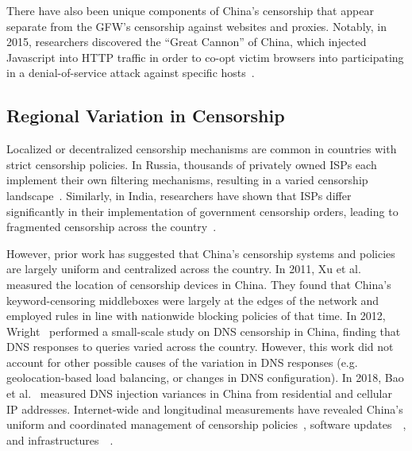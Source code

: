 \documentclass[conference,compsoc]{IEEEtran}
\begin{document}
There have also been unique components of China's censorship that appear
separate from the GFW's censorship against websites and proxies.
Notably,
in 2015, researchers discovered the ``Great Cannon'' of China,
which injected Javascript into HTTP traffic in order to
co-opt victim browsers into participating in a denial-of-service attack against
specific hosts~\cite{Marczak2015a}.

\subsection{Regional Variation in Censorship}

Localized or decentralized censorship mechanisms are common in countries with
strict censorship policies. In Russia, thousands of privately owned ISPs each
implement their own filtering mechanisms, resulting in a varied censorship
landscape~\cite{Xue2022b,Ortwein2023a,Ramesh2020a}.
Similarly, in India, researchers have shown that ISPs differ significantly in their implementation of government censorship orders,
leading to fragmented censorship across the country~\cite{Yadav2018a}.

However,
prior work has suggested that
China's censorship systems and policies are largely uniform and centralized across the country.
%
In 2011, Xu et al.~\cite{Xu2011a} measured the location of censorship devices in China.
They found that China's keyword-censoring middleboxes were largely at the edges of the network
and employed rules in line with nationwide blocking policies of that time.
In 2012, Wright~\cite{Wright2012a} performed a small-scale study on DNS
censorship in China, finding that DNS responses to queries varied across the country.
However, this work did not account for other possible causes of the variation in DNS responses
(e.g. geolocation-based load balancing, or changes in DNS configuration).
In 2018,
Bao et al.~\cite{Bao2018a} measured DNS injection variances in China from residential and cellular IP addresses.
Internet-wide and longitudinal measurements
have revealed China's
uniform and coordinated management of
censorship policies~\cite{Anonymous2020a, Hoang2021a, Wu2023a, Hoang2024a},
software updates~\cite[\S4.5]{Sakamoto2024a}~\cite[\S VII]{Fan2025a},
and infrastructures~\cite[\S3.4]{Alice2020a}~\cite[\S 5]{Anonymous2020a}.
\end{document}
